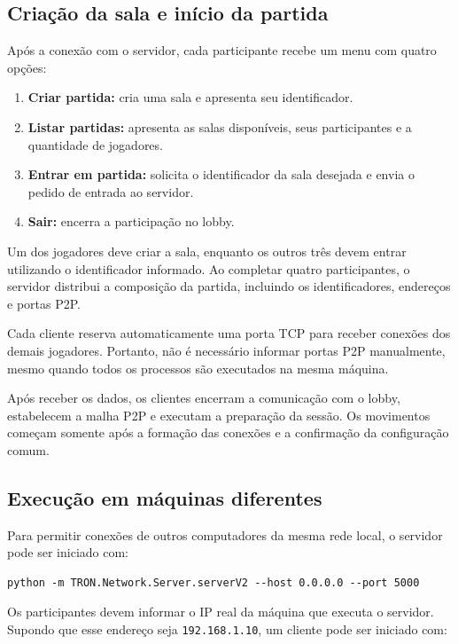 \documentclass[11pt,a4paper]{article}
\begin{document}
\begin{description}
\subsection{Criação da sala e início da partida}

Após a conexão com o servidor, cada participante recebe um menu com quatro opções:

\begin{enumerate}
    \item \textbf{Criar partida:} cria uma sala e apresenta seu identificador.
    \item \textbf{Listar partidas:} apresenta as salas disponíveis, seus participantes e a quantidade de jogadores.
    \item \textbf{Entrar em partida:} solicita o identificador da sala desejada e envia o pedido de entrada ao servidor.
    \item \textbf{Sair:} encerra a participação no lobby.
\end{enumerate}

Um dos jogadores deve criar a sala, enquanto os outros três devem entrar utilizando o identificador informado. Ao completar quatro participantes, o servidor distribui a composição da partida, incluindo os identificadores, endereços e portas P2P.

Cada cliente reserva automaticamente uma porta TCP para receber conexões dos demais jogadores. Portanto, não é necessário informar portas P2P manualmente, mesmo quando todos os processos são executados na mesma máquina.

Após receber os dados, os clientes encerram a comunicação com o lobby, estabelecem a malha P2P e executam a preparação da sessão. Os movimentos começam somente após a formação das conexões e a confirmação da configuração comum.

\subsection{Execução em máquinas diferentes}

Para permitir conexões de outros computadores da mesma rede local, o servidor pode ser iniciado com:

\begin{verbatim}
python -m TRON.Network.Server.serverV2 --host 0.0.0.0 --port 5000
\end{verbatim}

Os participantes devem informar o IP real da máquina que executa o servidor. Supondo que esse endereço seja \texttt{192.168.1.10}, um cliente pode ser iniciado com:


\end{description}
\end{document}
